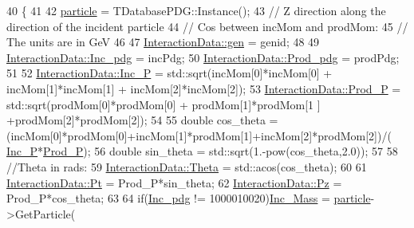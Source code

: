 \begin{DoxyCode}
40                                                                                                            
                                                       \{
41 
42     \hyperlink{class_neutrino_flux_reweight_1_1_interaction_data_a18c64cbdb5ca45143f1e97de157d7f99}{particle} = TDatabasePDG::Instance();
43     \textcolor{comment}{// Z direction along the direction of the incident particle}
44     \textcolor{comment}{// Cos between incMom and prodMom:}
45     \textcolor{comment}{// The units are in GeV}
46     
47     \hyperlink{class_neutrino_flux_reweight_1_1_interaction_data_a66f9342b71e54a2585b25fc3c72d8620}{InteractionData::gen}      = genid;
48     
49     \hyperlink{class_neutrino_flux_reweight_1_1_interaction_data_a3dd2f3bb4bc4d092b7ec53906c00473e}{InteractionData::Inc\_pdg}  = incPdg;
50     \hyperlink{class_neutrino_flux_reweight_1_1_interaction_data_aaf39f277663067e29fa997b208b09441}{InteractionData::Prod\_pdg} = prodPdg;
51     
52     \hyperlink{class_neutrino_flux_reweight_1_1_interaction_data_a0874ed9492a1ab56c775102dc4d0ad40}{InteractionData::Inc\_P}  = std::sqrt(incMom[0]*incMom[0] + incMom[1]*incMom[1] +
      incMom[2]*incMom[2]);
53     \hyperlink{class_neutrino_flux_reweight_1_1_interaction_data_a3fc5ae6cdef5d7883442abed079cc107}{InteractionData::Prod\_P} = std::sqrt(prodMom[0]*prodMom[0] + prodMom[1]*prodMom[1
      ] +prodMom[2]*prodMom[2]);
54     
55     \textcolor{keywordtype}{double} cos\_theta = (incMom[0]*prodMom[0]+incMom[1]*prodMom[1]+incMom[2]*prodMom[2])/(
      \hyperlink{class_neutrino_flux_reweight_1_1_interaction_data_a0874ed9492a1ab56c775102dc4d0ad40}{Inc\_P}*\hyperlink{class_neutrino_flux_reweight_1_1_interaction_data_a3fc5ae6cdef5d7883442abed079cc107}{Prod\_P});
56     \textcolor{keywordtype}{double} sin\_theta = std::sqrt(1.-pow(cos\_theta,2.0));
57     
58     \textcolor{comment}{//Theta in rads:  }
59     \hyperlink{class_neutrino_flux_reweight_1_1_interaction_data_a7b4a6f012f27fdda0c6521fdb033e863}{InteractionData::Theta} = std::acos(cos\_theta);
60     
61     \hyperlink{class_neutrino_flux_reweight_1_1_interaction_data_a769e8d7c2862f32c3526e4fce963ec79}{InteractionData::Pt} = Prod\_P*sin\_theta;
62     \hyperlink{class_neutrino_flux_reweight_1_1_interaction_data_a95a42582b8a1d910bc254cb74480b44f}{InteractionData::Pz} = Prod\_P*cos\_theta; 
63     
64     \textcolor{keywordflow}{if}(\hyperlink{class_neutrino_flux_reweight_1_1_interaction_data_a3dd2f3bb4bc4d092b7ec53906c00473e}{Inc\_pdg} != 1000010020)\hyperlink{class_neutrino_flux_reweight_1_1_interaction_data_abad3c8f9d2c30dc7105dc9d67125b7c8}{Inc\_Mass} = \hyperlink{class_neutrino_flux_reweight_1_1_interaction_data_a18c64cbdb5ca45143f1e97de157d7f99}{particle}->GetParticle(

\end{DoxyCode}

